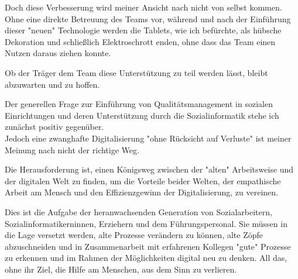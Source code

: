 Doch diese Verbesserung wird meiner Ansicht nach nicht von selbst kommen. Ohne eine direkte Betreuung des Teams vor, während und nach der Einführung dieser "{}neuen"{} Technologie werden die Tablets, wie ich befürchte, als hübsche Dekoration und schließlich Elektroschrott enden, ohne dass das Team einen Nutzen daraus ziehen konnte.

Ob der Träger dem Team diese Unterstützung zu teil werden lässt, bleibt abzuwarten und zu hoffen.

Der generellen Frage zur Einführung von Qualitätsmanagement in sozialen Einrichtungen und deren Unterstützung durch die Sozialinformatik stehe ich zunächst positiv gegenüber.\\
Jedoch eine zwanghafte Digitalisierung "{}ohne Rücksicht auf Verluste"{} ist meiner Meinung nach nicht der richtige Weg. 

Die Herausforderung ist, einen Königsweg zwischen der "{}alten"{} Arbeitsweise und der digitalen Welt zu finden, um die Vorteile beider Welten, der empathische Arbeit am Mensch und den Effizienzgewinn der Digitalisierung, zu vereinen. 

Dies ist die Aufgabe der heranwachsenden Generation von Sozialarbeitern, Sozialinformatikerninnen, Erziehern und dem Führungspersonal. Sie müssen in die Lage versetzt werden, alte Prozesse verändern zu können, alte Zöpfe abzuschneiden und in Zusammenarbeit mit erfahrenen Kollegen "{}gute"{} Prozesse zu erkennen und im Rahmen der Möglichkeiten digital neu zu denken. All das, ohne ihr Ziel, die Hilfe am Menschen, aus dem Sinn zu verlieren.
